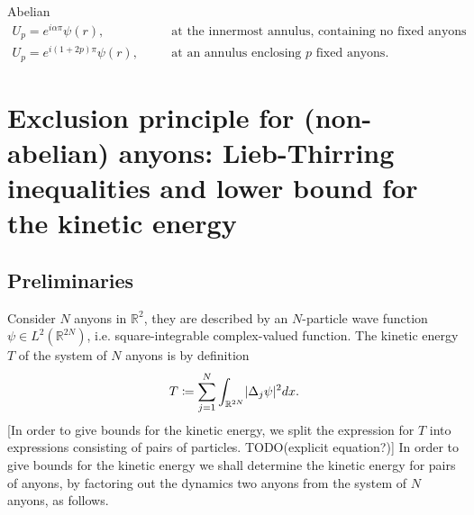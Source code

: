 \documentclass[a4paper,10pt,oneside]{book}
\theoremstyle{plain}
\theoremstyle{definition}
\theoremstyle{remark}
\DeclarePairedDelimiter\abs{\lvert}{\rvert}
\begin{document}
{Abelian
\begin{align*}
  U_p = e^{i\alpha \pi} \psi(r), && \quad \text{at the innermost annulus, containing no fixed anyons} \\
  U_p = e^{i(1+2p) \pi} \psi(r), && \quad \text{at an annulus enclosing $p$ fixed anyons.}
\end{align*}

















































\chapter{Exclusion principle for (non-abelian) anyons: Lieb-Thirring inequalities and lower bound for the kinetic energy}

\section{Preliminaries} %

Consider $N$ anyons in $\mathbb{R}^2$, they are described by an $N$-particle wave function $\psi \in L^2(\mathbb{R}^{2N})$, i.e. square-integrable complex-valued function. The kinetic energy $T$ of the system of $N$ anyons is by definition
\begin{align*} %
  T \coloneqq \sum_{j=1}^N \int_{\mathbb{R}^{2N}} \abs{\Delta_j \psi}^2 dx.
\end{align*}
[In order to give bounds for the kinetic energy, we split the expression for $T$ into expressions consisting of pairs of particles. TODO(explicit equation?)]
In order to give bounds for the kinetic energy we shall determine the kinetic energy for pairs of anyons, by factoring out the dynamics two anyons from the system of $N$ anyons, as follows.

}
\end{document}
